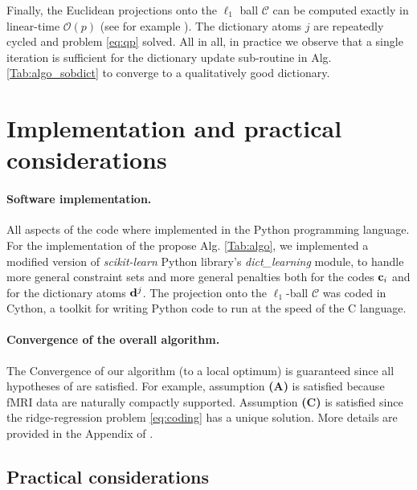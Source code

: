 Finally, the Euclidean projections onto the $\ell_1$ ball $\mathcal C$
can be computed exactly in linear-time $\mathcal O(p)$ (see for example
  \citep{condat2014fast,duchi2008efficient}).
The dictionary atoms $j$ are repeatedly cycled and problem \eqref{eq:qp} solved. %
All in all, in practice  we observe that a single iteration is sufficient
for the dictionary update sub-routine in Alg. \ref{Tab:algo_sobdict}
to converge to a qualitatively good dictionary.

\section{Implementation and practical considerations}
\paragraph{Software implementation.} All aspects of the code where
implemented in the Python programming language. 
For the implementation of the propose Alg. \ref{Tab:algo}, we
implemented a modified version of \textit{scikit-learn} Python library's
  \textit{dict\_learning} module, to handle more general constraint sets
  and more general penalties both for the codes $\mathbf{c}_i$ and for the
  dictionary atoms $\mathbf{d}^j$. The projection onto the $\ell_1$-ball $\mathcal C$ was coded in Cython, a toolkit for writing Python code to run at the speed of the C language.

\paragraph*{Convergence of the overall algorithm.}
The Convergence of our algorithm (to a local optimum) is guaranteed since all hypotheses of   \citep{mairal2010} are satisfied. For example, assumption \textbf{(A)} is satisfied because fMRI data are naturally compactly supported. Assumption \textbf{(C)} is satisfied since the ridge-regression problem \eqref{eq:coding} has a unique solution. More details are provided in the
Appendix of   \citep{dohmatob2016}.

\subsection{Practical considerations}
